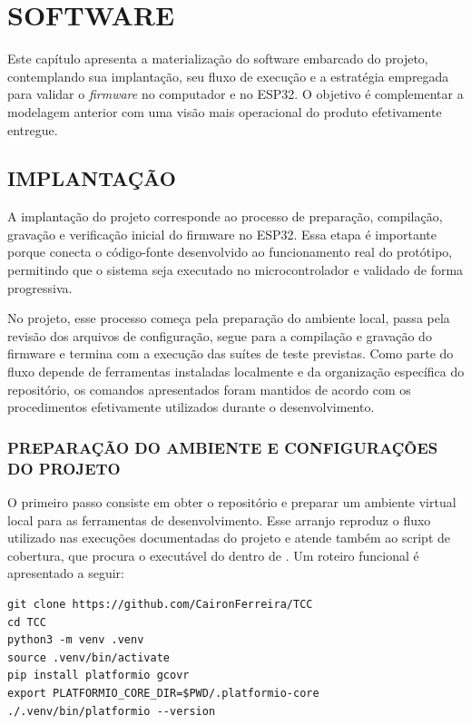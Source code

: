 \documentclass[
  12pt,
  oneside,
  a4paper,
  chapter=TITLE,
  section=TITLE,
  subsection=TITLE,
  brazil
]{abntex2}
\renewcommand{\texttt}[1]{\begingroup\ttfamily\seqsplit{#1}\endgroup}
\newcommand{\estrangeirismo}[1]{\textit{#1}}
\begin{document}
\chapter{SOFTWARE}
\label{sec:software}

Este capítulo apresenta a materialização do software embarcado do projeto, contemplando sua implantação, seu fluxo de execução e a estratégia empregada para validar o \estrangeirismo{firmware} no computador e no ESP32. O objetivo é complementar a modelagem anterior com uma visão mais operacional do produto efetivamente entregue.

\section{IMPLANTAÇÃO}

A implantação do projeto corresponde ao processo de preparação, compilação, gravação e verificação inicial do firmware no ESP32. Essa etapa é importante porque conecta o código-fonte desenvolvido ao funcionamento real do protótipo, permitindo que o sistema seja executado no microcontrolador e validado de forma progressiva.

No projeto, esse processo começa pela preparação do ambiente local, passa pela revisão dos arquivos de configuração, segue para a compilação e gravação do firmware e termina com a execução das suítes de teste previstas. Como parte do fluxo depende de ferramentas instaladas localmente e da organização específica do repositório, os comandos apresentados foram mantidos de acordo com os procedimentos efetivamente utilizados durante o desenvolvimento.

\subsection{PREPARAÇÃO DO AMBIENTE E CONFIGURAÇÕES DO PROJETO}

O primeiro passo consiste em obter o repositório e preparar um ambiente virtual local para as ferramentas de desenvolvimento. Esse arranjo reproduz o fluxo utilizado nas execuções documentadas do projeto e atende também ao script de cobertura, que procura o executável do \texttt{gcovr} dentro de \texttt{./.venv}. Um roteiro funcional é apresentado a seguir:

\begin{verbatim}
git clone https://github.com/CaironFerreira/TCC
cd TCC
python3 -m venv .venv
source .venv/bin/activate
pip install platformio gcovr
export PLATFORMIO_CORE_DIR=$PWD/.platformio-core
./.venv/bin/platformio --version
\end{verbatim}
\end{document}

